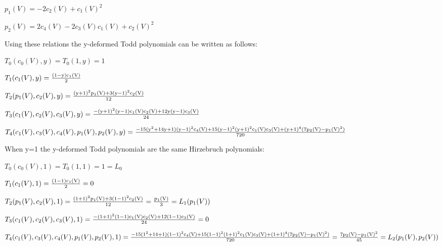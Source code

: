 \documentclass[a4paper,a4paper]{article}
\begin{document}
\begin{center}
{  $ p_1(V) = -2c_2(V)+c_1(V)^2$ }
\end{center}

\begin{center}
{  $ p_2(V) = 2c_4(V)-2c_3(V)c_1(V)+c_2(V)^2$ }
\end{center}

Using these relations the y-deformed Todd polynomials can be written as follows:

\begin{center}
{  $ T_0(c_0(V),y) =T _0(1,y)=1 $ }
\end{center}
\begin{center}
{  $ T_1(c_1(V),y) = \frac{\rm (1-y)c_1(V)}{\rm 2} $ }
\end{center}
\begin{center}
{  $ T_2(p_1(V),c_2(V),y) = \frac{\rm (y+1)^2p_1(V)+3(y-1)^2c_2(V)}{\rm 12} $ }
\end{center}
\begin{center}
{  $ T_3(c_1(V),c_2(V),c_3(V),y) = \frac{\rm -(y+1)^2(y-1)c_1(V)c_2(V)+12y(y-1)c_3(V)}{\rm 24} $ }
\end{center}
\begin{center}
{  $ T_4(c_1(V),c_3(V),c_4(V),p_1(V),p_2(V),y) = \frac{\rm -15(y^2+14y+1)(y-1)^2c_4(V)+15(y-1)^2(y+1)^2c_1(V)c_3(V)+(y+1)^4(7p_2(V)-p_1(V)^2)}{\rm 720} $ }
\end{center}
When y=1 the y-deformed Todd polynomials are the same Hirzebruch polynomials:
\begin{center}
{  $ T_0(c_0(V),1) =T _0(1,1)=1=L_0 $ }
\end{center}
\begin{center}
{  $ T_1(c_1(V),1) = \frac{\rm (1-1)c_1(V)}{\rm 2}=0 $ }
\end{center}
\begin{center}
{  $ T_2(p_1(V),c_2(V),1) = \frac{\rm (1+1)^2p_1(V)+3(1-1)^2c_2(V)}{\rm 12}=\frac{\rm p_1(V)}{\rm 3}=L_1(p_1(V)) $ }
\end{center}
\begin{center}
{  $ T_3(c_1(V),c_2(V),c_3(V),1) = \frac{\rm -(1+1)^2(1-1)c_1(V)c_2(V)+12(1-1)c_3(V)}{\rm 24}=0 $ }
\end{center}
\begin{center}
{  $ T_4(c_1(V),c_3(V),c_4(V),p_1(V),p_2(V),1) = \frac{\rm -15(1^2+14+1)(1-1)^2c_4(V)+15(1-1)^2(1+1)^2c_1(V)c_3(V)+(1+1)^4(7p_2(V)-p_1(V)^2)}{\rm 720}= \frac{\rm 7p_2(V)-p_1(V)^2}{\rm 45}=L_2(p_1(V),p_2(V))$ }
\end{center}
\end{document}
